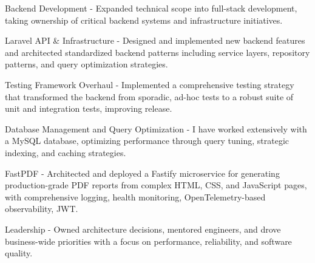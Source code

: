 \begin{cventries}
{\begin{cvsubitems}
        \end{cvsubitems}
        \begin{cvitems} %
            \item {Backend Development - Expanded technical scope into full-stack development, taking ownership of critical backend systems and infrastructure initiatives.}
        \end{cvitems}
        \begin{cvsubitems}
            \item {Laravel API \& Infrastructure - Designed and implemented new backend features and architected standardized backend patterns including service layers, repository patterns, and query optimization strategies.}
            \item {Testing Framework Overhaul - Implemented a comprehensive testing strategy that transformed the backend from sporadic, ad-hoc tests to a robust suite of unit and integration tests, improving release.}
            \item {Database Management and Query Optimization - I have worked extensively with a MySQL database, optimizing performance through query tuning, strategic indexing, and caching strategies.}
            \item {FastPDF - Architected and deployed a Fastify microservice for generating production-grade PDF reports from complex HTML, CSS, and JavaScript pages, with comprehensive logging, health monitoring, OpenTelemetry-based observability, JWT.}
        \end{cvsubitems}
        \begin{cvitems}
            \item {Leadership - Owned architecture decisions, mentored engineers, and drove business-wide priorities with a focus on performance, reliability, and software quality.}
        \end{cvitems}
    }
\end{cventries}
